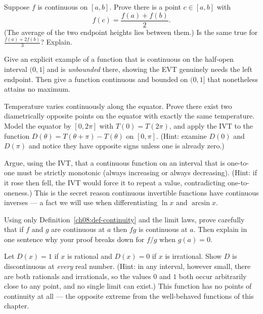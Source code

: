 \begin{exercise}
\label{ch08:exr-avg}
Suppose $f$ is continuous on $[a,b]$. Prove there is a point $c\in[a,b]$ with
\[
  f(c)=\frac{f(a)+f(b)}{2}.
\]
(The average of the two endpoint heights lies between them.) Is the same true for
$\frac{f(a)+2f(b)}{3}$? Explain.
\end{exercise}

\begin{exercise}
\label{ch08:exr-hyp}
Give an explicit example of a function that is continuous on the half-open interval
$(0,1]$ and is \emph{unbounded} there, showing the EVT genuinely needs the left endpoint.
Then give a function continuous and bounded on $(0,1]$ that nonetheless attains no maximum.
\end{exercise}

\begin{exercise}
\label{ch08:exr-antipodal}
Temperature varies continuously along the equator. Prove there exist two diametrically
opposite points on the equator with exactly the same temperature. Model the equator by
$[0,2\pi]$ with $T(0)=T(2\pi)$, and apply the IVT to the function
$D(\theta)=T(\theta+\pi)-T(\theta)$ on $[0,\pi]$. (Hint: examine $D(0)$ and $D(\pi)$ and
notice they have opposite signs unless one is already zero.)
\end{exercise}

\begin{exercise}
\label{ch08:exr-monotone}
Argue, using the IVT, that a continuous function on an interval that is one-to-one must be
strictly monotonic (always increasing or always decreasing). (Hint: if it rose then fell,
the IVT would force it to repeat a value, contradicting one-to-oneness.) This is the secret
reason continuous invertible functions have continuous inverses --- a fact we will use when
differentiating $\ln x$ and $\arcsin x$.
\end{exercise}

\begin{exercise}
\label{ch08:exr-prove}
Using only Definition~\ref{ch08:def-continuity} and the limit laws, prove carefully that if
$f$ and $g$ are continuous at $a$ then $fg$ is continuous at $a$. Then explain in one
sentence why your proof breaks down for $f/g$ when $g(a)=0$.
\end{exercise}

\begin{exercise}
\label{ch08:exr-dirichlet}
Let $D(x)=1$ if $x$ is rational and $D(x)=0$ if $x$ is irrational. Show $D$ is discontinuous
at \emph{every} real number. (Hint: in any interval, however small, there are both rationals
and irrationals, so the values $0$ and $1$ both occur arbitrarily close to any point, and no
single limit can exist.) This function has no points of continuity at all --- the opposite
extreme from the well-behaved functions of this chapter.
\end{exercise}
